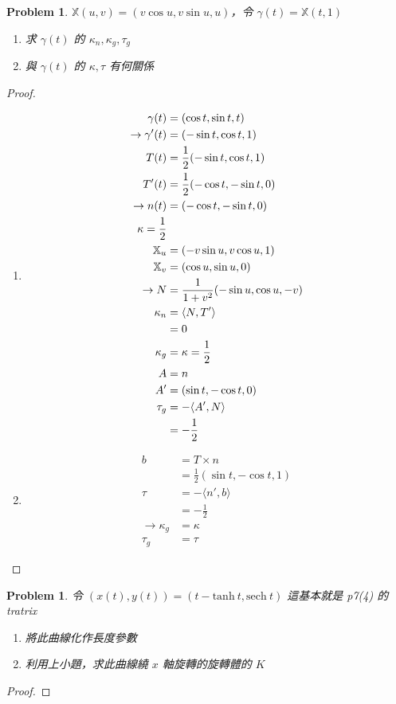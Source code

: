 \documentclass[10pt,a4paper]{article}
\newcounter{theProblemCounter}
\newtheorem{problem}[theProblemCounter]{Problem}
\begin{document}
\setcounter{theProblemCounter}{4}
\begin{problem}
$\mathbb{X}(u, v) = (v\cos u, v\sin u, u)$，令 $\gamma(t)=\mathbb{X}(t, 1)$
\begin{enumerate}[{ (}a{)}]
\item 求 $\gamma(t)$ 的 $\kappa_n, \kappa_g, \tau_g$
\item 與 $\gamma(t)$ 的 $\kappa, \tau$ 有何關係
\end{enumerate}
\end{problem}
\begin{proof}
\begin{enumerate}[{ (}a{)}]
\item
\begin{align*}
\gamma(t)&=(\cos t, \sin t, t)\\
\rightarrow \gamma'(t)&=(-\sin t,\cos t,1)\\
T(t)&=\frac{1}{2}(-\sin t,\cos t,1)\\
T'(t)&=\frac{1}{2}(-\cos t,-\sin t,0)\\
\rightarrow n(t)&=(-\cos t,-\sin t,0)\\
\kappa = \frac{1}{2}\\
\mathbb{X}_u&=(-v\sin u,v\cos u,1)\\
\mathbb{X}_v&=(\cos u,\sin u,0)\\
\rightarrow N&=\frac{1}{1+v^2}(-\sin u, \cos u,-v)\\
\kappa_n&=\langle N,T'\rangle\\
&=0\\
\kappa_g&=\kappa = \frac{1}{2}\\
A&=n\\
A'&=(\sin t,-\cos t,0)\\
\tau_g&=-\langle A',N\rangle\\
&=-\frac{1}{2}
\end{align*}
\item
\begin{align*}
b&=T\times n\\
&=\frac{1}{2}(\sin t,-\cos t, 1)\\
\tau&=-\langle n', b\rangle\\
&=-\frac{1}{2}\\
\rightarrow \kappa_g&=\kappa\\
\tau_g &= \tau
\end{align*}
\end{enumerate}
\end{proof}

\setcounter{theProblemCounter}{5}
\begin{problem}
令 $(x(t), y(t)) = (t-\mathrm{tanh\ } t, \mathrm{sech\ } t)$ 這基本就是 p7(4) 的 tratrix
\begin{enumerate}[{ (}a{)}]
\item 將此曲線化作長度參數
\item 利用上小題，求此曲線繞 $x$ 軸旋轉的旋轉體的 $K$
\end{enumerate}
\end{problem}

\begin{proof}
\end{proof}
\end{document}
